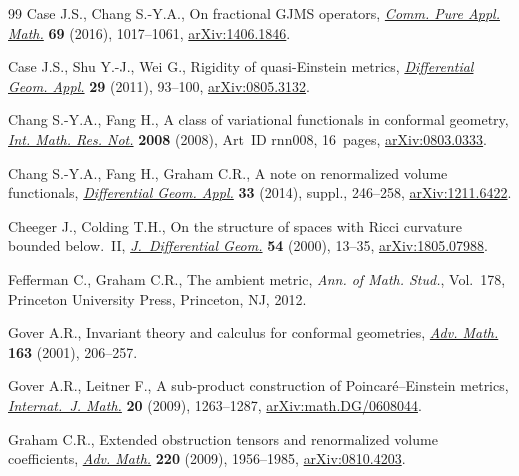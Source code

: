 \begin{thebibliography}{99}
Case J.S., Chang S.-Y.A., On fractional {GJMS} operators, \href{https://doi.org/10.1002/cpa.21564}{\textit{Comm. Pure
 Appl. Math.}} \textbf{69} (2016), 1017--1061, \href{https://arxiv.org/abs/1406.1846}{arXiv:1406.1846}.

Case J.S., Shu Y.-J., Wei G., Rigidity of quasi-{E}instein metrics,
 \href{https://doi.org/10.1016/j.difgeo.2010.11.003}{\textit{Differential Geom. Appl.}} \textbf{29} (2011), 93--100,
 \href{https://arxiv.org/abs/0805.3132}{arXiv:0805.3132}.

Chang S.-Y.A., Fang H., A class of variational functionals in conformal
 geometry, \href{https://doi.org/10.1093/imrn/rnn008}{\textit{Int. Math. Res. Not.}} \textbf{2008} (2008), Art~ID rnn008,
 16~pages, \href{https://arxiv.org/abs/0803.0333}{arXiv:0803.0333}.

Chang S.-Y.A., Fang H., Graham C.R., A note on renormalized volume functionals,
 \href{https://doi.org/10.1016/j.difgeo.2013.10.001}{\textit{Differential Geom. Appl.}} \textbf{33} (2014), suppl., 246--258,
 \href{https://arxiv.org/abs/1211.6422}{arXiv:1211.6422}.

Cheeger J., Colding T.H., On the structure of spaces with {R}icci curvature
 bounded below.~{II}, \href{https://doi.org/10.4310/jdg/1214342145}{\textit{J.~Differential Geom.}} \textbf{54} (2000),
 13--35, \href{https://arxiv.org/abs/1805.07988}{arXiv:1805.07988}.

Fefferman C., Graham C.R., The ambient metric, \textit{Ann. of Math. Stud.},
 Vol.~178, Princeton University Press, Princeton, NJ, 2012.

Gover A.R., Invariant theory and calculus for conformal geometries,
 \href{https://doi.org/10.1006/aima.2001.1999}{\textit{Adv. Math.}} \textbf{163} (2001), 206--257.

Gover A.R., Leitner F., A sub-product construction of {P}oincar\'e--{E}instein
 metrics, \href{https://doi.org/10.1142/S0129167X09005753}{\textit{Internat.~J. Math.}} \textbf{20} (2009), 1263--1287,
 \href{https://arxiv.org/abs/math.DG/0608044}{arXiv:math.DG/0608044}.

Graham C.R., Extended obstruction tensors and renormalized volume coefficients,
 \href{https://doi.org/10.1016/j.aim.2008.11.015}{\textit{Adv. Math.}} \textbf{220} (2009), 1956--1985, \href{https://arxiv.org/abs/0810.4203}{arXiv:0810.4203}.


\end{thebibliography}

